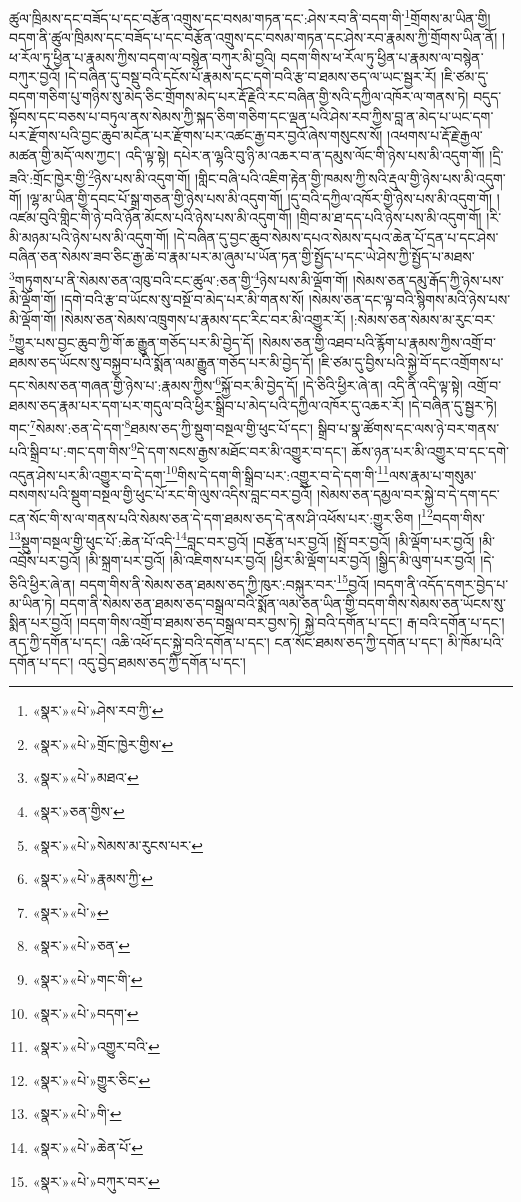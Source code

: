 ཚུལ་ཁྲིམས་དང་བཟོད་པ་དང་བརྩོན་འགྲུས་དང་བསམ་གཏན་དང་:ཤེས་རབ་ནི་བདག་གི་\footnote{«སྣར་»«པེ་»ཤེས་རབ་ཀྱི་}གྲོགས་མ་ཡིན་གྱི། བདག་ནི་ཚུལ་ཁྲིམས་དང་བཟོད་པ་དང་བརྩོན་འགྲུས་དང་བསམ་གཏན་དང་ཤེས་རབ་རྣམས་ཀྱི་གྲོགས་ཡིན་ནོ། །ཕ་རོལ་ཏུ་ཕྱིན་པ་རྣམས་ཀྱིས་བདག་ལ་བསྙེན་བཀུར་མི་བྱའི། བདག་གིས་ཕ་རོལ་ཏུ་ཕྱིན་པ་རྣམས་ལ་བསྙེན་བཀུར་བྱའོ། །དེ་བཞིན་དུ་བསྡུ་བའི་དངོས་པོ་རྣམས་དང་དགེ་བའི་རྩ་བ་ཐམས་ཅད་ལ་ཡང་སྦྱར་རོ། །ཇི་ཙམ་དུ་བདག་གཅིག་པུ་གཉིས་སུ་མེད་ཅིང་གྲོགས་མེད་པར་རྡོ་རྗེའི་རང་བཞིན་གྱི་སའི་དཀྱིལ་འཁོར་ལ་གནས་ཏེ། བདུད་སྟོབས་དང་བཅས་པ་བཏུལ་ནས་སེམས་ཀྱི་སྐད་ཅིག་གཅིག་དང་ལྡན་པའི་ཤེས་རབ་ཀྱིས་བླ་ན་མེད་པ་ཡང་དག་པར་རྫོགས་པའི་བྱང་ཆུབ་མངོན་པར་རྫོགས་པར་འཚང་རྒྱ་བར་བྱའོ་ཞེས་གསུངས་སོ། །འཕགས་པ་རྡོ་རྗེ་རྒྱལ་མཚན་གྱི་མདོ་ལས་ཀྱང་། འདི་ལྟ་སྟེ། དཔེར་ན་ལྷའི་བུ་ཉི་མ་འཆར་བ་ན་དམུས་ལོང་གི་ཉེས་པས་མི་འདུག་གོ། །དྲི་ཟའི་:གྲོང་ཁྱེར་གྱི་\footnote{«སྣར་»«པེ་»གྲོང་ཁྱེར་གྱིས་}ཉེས་པས་མི་འདུག་གོ། །གླིང་བཞི་པའི་འཇིག་རྟེན་གྱི་ཁམས་ཀྱི་སའི་རྡུལ་གྱི་ཉེས་པས་མི་འདུག་གོ། །ལྷ་མ་ཡིན་གྱི་དབང་པོ་སྒྲ་གཅན་གྱི་ཉེས་པས་མི་འདུག་གོ། །དུ་བའི་དཀྱིལ་འཁོར་གྱི་ཉེས་པས་མི་འདུག་གོ། །འཛམ་བུའི་གླིང་གི་ཉེ་བའི་ཉོན་མོངས་པའི་ཉེས་པས་མི་འདུག་གོ། །གྲིབ་མ་ཐ་དད་པའི་ཉེས་པས་མི་འདུག་གོ། །རི་མི་མཉམ་པའི་ཉེས་པས་མི་འདུག་གོ། །དེ་བཞིན་དུ་བྱང་ཆུབ་སེམས་དཔའ་སེམས་དཔའ་ཆེན་པོ་དྲན་པ་དང་ཤེས་བཞིན་ཅན་སེམས་ཟབ་ཅིང་རྒྱ་ཆེ་བ་རྣམ་པར་མ་ཞུམ་པ་ཡོན་ཏན་གྱི་སྤྱོད་པ་དང་ཡེ་ཤེས་ཀྱི་སྤྱོད་པ་མཐས་\footnote{«སྣར་»«པེ་»མཐའ་}གཏུགས་པ་ནི་སེམས་ཅན་འཁུ་བའི་ངང་ཚུལ་:ཅན་གྱི་\footnote{«སྣར་»ཅན་གྱིས་}ཉེས་པས་མི་ལྡོག་གོ། །སེམས་ཅན་དམུ་རྒོད་ཀྱི་ཉེས་པས་མི་ལྡོག་གོ། །དགེ་བའི་རྩ་བ་ཡོངས་སུ་བསྔོ་བ་མེད་པར་མི་གནས་སོ། །སེམས་ཅན་དང་ལྟ་བའི་སྙིགས་མའི་ཉེས་པས་མི་ལྡོག་གོ། །སེམས་ཅན་སེམས་འཁྲུགས་པ་རྣམས་དང་རིང་བར་མི་འགྱུར་རོ། །:སེམས་ཅན་སེམས་མ་རུང་བར་\footnote{«སྣར་»«པེ་»སེམས་མ་རུངས་པར་}གྱུར་པས་བྱང་ཆུབ་ཀྱི་གོ་ཆ་རྒྱུན་གཅོད་པར་མི་བྱེད་དོ། །སེམས་ཅན་གྱི་འཐབ་པའི་རྙོག་པ་རྣམས་ཀྱིས་འགྲོ་བ་ཐམས་ཅད་ཡོངས་སུ་བསྐྱབ་པའི་སྨོན་ལམ་རྒྱུན་གཅོད་པར་མི་བྱེད་དོ། །ཇི་ཙམ་དུ་བྱིས་པའི་སྐྱེ་བོ་དང་འགྲོགས་པ་དང་སེམས་ཅན་གཞན་གྱི་ཉེས་པ་:རྣམས་ཀྱིས་\footnote{«སྣར་»«པེ་»རྣམས་ཀྱི་}སྐྱོ་བར་མི་བྱེད་དོ། །དེ་ཅིའི་ཕྱིར་ཞེ་ན། འདི་ནི་འདི་ལྟ་སྟེ། འགྲོ་བ་ཐམས་ཅད་རྣམ་པར་དག་པར་གདུལ་བའི་ཕྱིར་སྒྲིབ་པ་མེད་པའི་དཀྱིལ་འཁོར་དུ་འཆར་རོ། །དེ་བཞིན་དུ་སྦྱར་ཏེ། གང་\footnote{«སྣར་»«པེ་»}སེམས་:ཅན་དེ་དག་\footnote{«སྣར་»«པེ་»ཅན་}ཐམས་ཅད་ཀྱི་སྡུག་བསྔལ་གྱི་ཕུང་པོ་དང་། སྒྲིབ་པ་སྣ་ཚོགས་དང་ལས་ཉེ་བར་གནས་པའི་སྒྲིབ་པ་:གང་དག་གིས་\footnote{«སྣར་»«པེ་»གང་གི་}དེ་དག་སངས་རྒྱས་མཐོང་བར་མི་འགྱུར་བ་དང་། ཆོས་ཉན་པར་མི་འགྱུར་བ་དང་དགེ་འདུན་ཤེས་པར་མི་འགྱུར་བ་དེ་དག་\footnote{«སྣར་»«པེ་»བདག་}གིས་དེ་དག་གི་སྒྲིབ་པར་:འགྱུར་བ་དེ་དག་གི་\footnote{«སྣར་»«པེ་»འགྱུར་བའི་}ལས་རྣམ་པ་གསུམ་བསགས་པའི་སྡུག་བསྔལ་གྱི་ཕུང་པོ་རང་གི་ལུས་འདིས་བླང་བར་བྱའོ། །སེམས་ཅན་དམྱལ་བར་སྐྱེ་བ་དེ་དག་དང་ངན་སོང་གི་ས་ལ་གནས་པའི་སེམས་ཅན་དེ་དག་ཐམས་ཅད་དེ་ནས་ཤི་འཕོས་པར་:གྱུར་ཅིག །\footnote{«སྣར་»«པེ་»གྱུར་ཅིང་}བདག་གིས་\footnote{«སྣར་»«པེ་»གི་}སྡུག་བསྔལ་གྱི་ཕུང་པོ་:ཆེན་པོ་འདི་\footnote{«སྣར་»«པེ་»ཆེན་པོ་}བླང་བར་བྱའོ། །བརྩོན་པར་བྱའོ། །སྤྲོ་བར་བྱའོ། །མི་ལྡོག་པར་བྱའོ། །མི་འབྲོས་པར་བྱའོ། །མི་སྐྲག་པར་བྱའོ། །མི་འཇིགས་པར་བྱའོ། །ཕྱིར་མི་ལྡོག་པར་བྱའོ། །སྒྱིད་མི་ལུག་པར་བྱའོ། །དེ་ཅིའི་ཕྱིར་ཞེ་ན། བདག་གིས་ནི་སེམས་ཅན་ཐམས་ཅད་ཀྱི་ཁུར་:བསྐུར་བར་\footnote{«སྣར་»«པེ་»བཀུར་བར་}བྱའོ། །བདག་ནི་འདོད་དགར་བྱེད་པ་མ་ཡིན་ཏེ། བདག་ནི་སེམས་ཅན་ཐམས་ཅད་བསྒྲལ་བའི་སྨོན་ལམ་ཅན་ཡིན་གྱི་བདག་གིས་སེམས་ཅན་ཡོངས་སུ་སྨིན་པར་བྱའོ། །བདག་གིས་འགྲོ་བ་ཐམས་ཅད་བསྒྲལ་བར་བྱས་ཏེ། སྐྱེ་བའི་དགོན་པ་དང་། རྒ་བའི་དགོན་པ་དང་། ནད་ཀྱི་དགོན་པ་དང་། འཆི་འཕོ་དང་སྐྱེ་བའི་དགོན་པ་དང་། ངན་སོང་ཐམས་ཅད་ཀྱི་དགོན་པ་དང་། མི་ཁོམ་པའི་དགོན་པ་དང་། འདུ་བྱེད་ཐམས་ཅད་ཀྱི་དགོན་པ་དང་། 